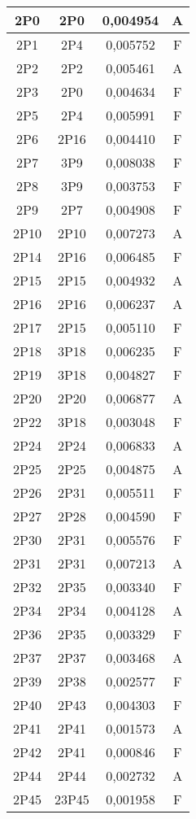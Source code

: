 \begin{center}
\begin{longtable}{|c|c|c|c|}
	\hline	2P0	&	2P0	&	0,004954	&	A	\\
	\hline	2P1	&	2P4	&	0,005752	&	F	\\
	\hline	2P2	&	2P2	&	0,005461	&	A	\\
	\hline	2P3	&	2P0	&	0,004634	&	F	\\
	\hline	2P5	&	2P4	&	0,005991	&	F	\\
	\hline	2P6	&	2P16	&	0,004410	&	F	\\
	\hline	2P7	&	3P9	&	0,008038	&	F	\\
	\hline	2P8	&	3P9	&	0,003753	&	F	\\
	\hline	2P9	&	2P7	&	0,004908	&	F	\\
	\hline	2P10	&	2P10	&	0,007273	&	A	\\
	\hline	2P14	&	2P16	&	0,006485	&	F	\\
	\hline	2P15	&	2P15	&	0,004932	&	A	\\
	\hline	2P16	&	2P16	&	0,006237	&	A	\\
	\hline	2P17	&	2P15	&	0,005110	&	F	\\
	\hline	2P18	&	3P18	&	0,006235	&	F	\\
	\hline	2P19	&	3P18	&	0,004827	&	F	\\
	\hline	2P20	&	2P20	&	0,006877	&	A	\\
	\hline	2P22	&	3P18	&	0,003048	&	F	\\
	\hline	2P24	&	2P24	&	0,006833	&	A	\\
	\hline	2P25	&	2P25	&	0,004875	&	A	\\
	\hline	2P26	&	2P31	&	0,005511	&	F	\\
	\hline	2P27	&	2P28	&	0,004590	&	F	\\
	\hline	2P30	&	2P31	&	0,005576	&	F	\\
	\hline	2P31	&	2P31	&	0,007213	&	A	\\
	\hline	2P32	&	2P35	&	0,003340	&	F	\\
	\hline	2P34	&	2P34	&	0,004128	&	A	\\
	\hline	2P36	&	2P35	&	0,003329	&	F	\\
	\hline	2P37	&	2P37	&	0,003468	&	A	\\
	\hline	2P39	&	2P38	&	0,002577	&	F	\\
	\hline	2P40	&	2P43	&	0,004303	&	F	\\
	\hline	2P41	&	2P41	&	0,001573	&	A	\\
	\hline	2P42	&	2P41	&	0,000846	&	F	\\
	\hline	2P44	&	2P44	&	0,002732	&	A	\\
	\hline	2P45	&	23P45	&	0,001958	&	F	\\

\end{longtable}
\end{center}
